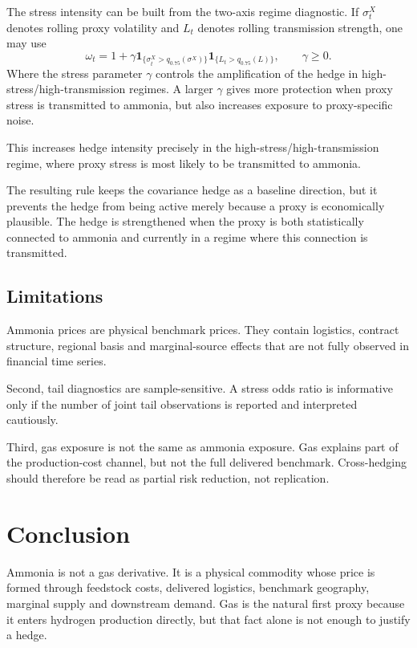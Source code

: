 \documentclass[11pt]{article}
\newcommand{\1}{\mathbf 1}
\begin{document}
The stress intensity can be built from the two-axis regime diagnostic. If $\sigma^X_t$ denotes rolling proxy volatility and $L_t$ denotes rolling transmission strength, one may use
\[
\omega_t
=
1
+
\gamma
\mathbf 1_{\{\sigma^X_t > q_{0.75}(\sigma^X)\}}
\mathbf 1_{\{L_t > q_{0.75}(L)\}},
\qquad
\gamma \ge 0.
\]
Where the stress parameter $\gamma$ controls the amplification of the hedge in high-stress/high-transmission regimes. A larger $\gamma$ gives more protection when proxy stress is transmitted to ammonia, but also increases exposure to proxy-specific noise.

This increases hedge intensity precisely in the high-stress/high-transmission regime, where proxy stress is most likely to be transmitted to ammonia.

The resulting rule keeps the covariance hedge as a baseline direction, but it prevents the hedge from being active merely because a proxy is economically plausible. The hedge is strengthened when the proxy is both statistically connected to ammonia and currently in a regime where this connection is transmitted.

\subsection{Limitations}

Ammonia prices are physical benchmark prices. They contain logistics, contract structure, regional basis and marginal-source effects that are not fully observed in financial time series.

Second, tail diagnostics are sample-sensitive. A stress odds ratio is informative only if the number of joint tail observations is reported and interpreted cautiously.

Third, gas exposure is not the same as ammonia exposure. Gas explains part of the production-cost channel, but not the full delivered benchmark. Cross-hedging should therefore be read as partial risk reduction, not replication.

\section{Conclusion}

Ammonia is not a gas derivative. It is a physical commodity whose price is formed through feedstock costs, delivered logistics, benchmark geography, marginal supply and downstream demand. Gas is the natural first proxy because it enters hydrogen production directly, but that fact alone is not enough to justify a hedge.
\end{document}
